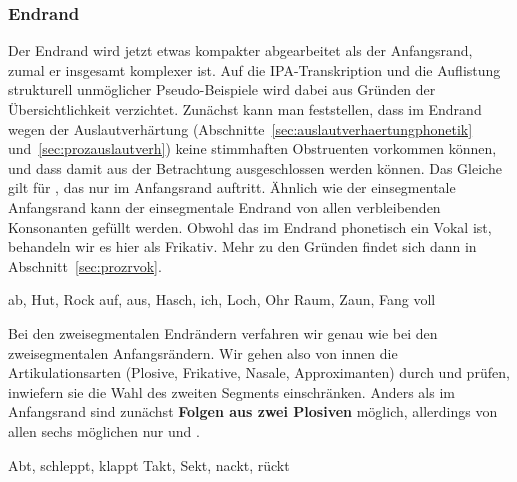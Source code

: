 \begin{exe}
	\ex\label{ex:phol777206}
	\begin{xlist}
	\end{xlist}
\end{exe}




\subsubsection{Endrand}

\label{sec:endranddeskriptiv}

Der Endrand wird jetzt etwas kompakter abgearbeitet als der Anfangsrand, zumal er insgesamt komplexer ist.
Auf die IPA-Transkription und die Auflistung strukturell unmöglicher Pseudo-Beispiele wird dabei aus Gründen der Übersichtlichkeit verzichtet.
Zunächst kann man feststellen, dass im Endrand wegen der Auslautverhärtung (Abschnitte~\ref{sec:auslautverhaertungphonetik} und~\ref{sec:prozauslautverh}) keine stimmhaften Obstruenten vorkommen können, und dass damit \textipa{[b d g v z J]} aus der Betrachtung ausgeschlossen werden können.
Das Gleiche gilt für \textipa{[h]}, das nur im Anfangsrand auftritt.
Ähnlich wie der einsegmentale Anfangsrand kann der einsegmentale Endrand von allen verbleibenden Konsonanten gefüllt werden.
Obwohl das \textipa{[K]} im Endrand phonetisch ein Vokal ist, behandeln wir es hier als Frikativ.
Mehr zu den Gründen findet sich dann in Abschnitt~\ref{sec:prozrvok}.

\begin{exe}
  \ex\label{ex:phol4711}
  \begin{xlist}
  	\ex ab, Hut, Rock
  	\ex auf, aus, Hasch, ich, Loch, Ohr
  	\ex Raum, Zaun, Fang
  	\ex voll
  \end{xlist}
\end{exe}

Bei den zweisegmentalen Endrändern verfahren wir genau wie bei den zweisegmentalen Anfangsrändern.
Wir gehen also von innen die Artikulationsarten (Plosive, Frikative, Nasale, Approximanten) durch und prüfen, inwiefern sie die Wahl des zweiten Segments einschränken.
Anders als im Anfangsrand sind zunächst \textbf{Folgen aus zwei Plosiven} möglich, allerdings von allen sechs möglichen nur \textipa{[pt]} und \textipa{[kt]}.

\begin{exe}
  \ex\label{ex:phol4712}
  \begin{xlist}
  	\ex Abt, schleppt, klappt
  	\ex Takt, Sekt, nackt, rückt
  \end{xlist}
\end{exe}

